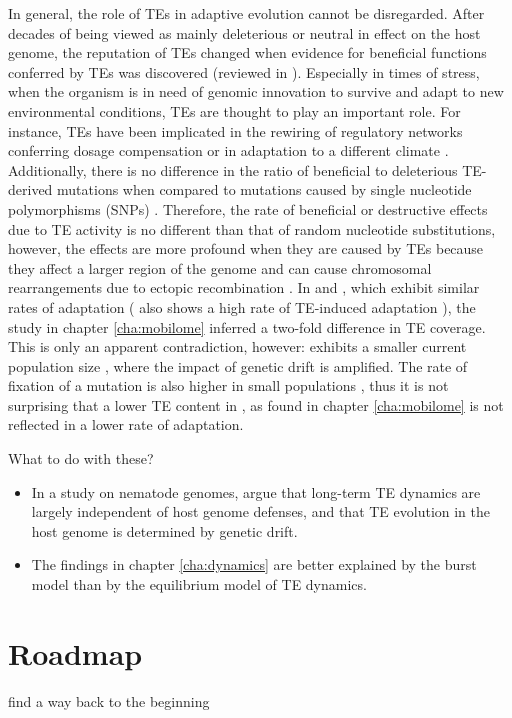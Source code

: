 In general, the role of TEs in adaptive evolution cannot be disregarded.
After decades of being viewed as mainly deleterious or neutral in effect
on the host genome, the reputation of TEs changed when evidence for
beneficial functions conferred by TEs was discovered (reviewed in
\citet{Oliver2012, Fedoroff2013}). Especially in times of stress, when
the organism is in need of genomic innovation to survive and adapt to
new environmental conditions, TEs are thought to play an important role.
For instance, TEs have been implicated in the rewiring of regulatory
networks conferring dosage compensation \citep{Ellison2013, Chuong2017}
or in adaptation to a different climate \citep{Gonzalez2010}.
Additionally, there is no difference in the ratio of beneficial to
deleterious TE-derived mutations when compared to mutations caused by
single nucleotide polymorphisms (SNPs) \citep{Akagi2013, Barron2014}.
Therefore, the rate of beneficial or destructive effects due to TE
activity is no different than that of random nucleotide substitutions,
however, the effects are more profound when they are caused by TEs
because they affect a larger region of the genome and can cause
chromosomal rearrangements due to ectopic recombination
\citep{Gray2000}. In  and , which exhibit similar rates of adaptation \citep{Bachtrog2008}
( also shows a high rate of TE-induced
adaptation \citep{Gonzalez2008}), the study in chapter
\ref{cha:mobilome} inferred a two-fold difference in TE coverage. This
is only an apparent contradiction, however: 
exhibits a smaller current population size \citep{Bachtrog2008}, where
the impact of genetic drift is amplified. The rate of fixation of a
mutation is also higher in small populations \citep{Kimura1969}, thus it
is not surprising that a lower TE content in , as
found in chapter \ref{cha:mobilome} is not reflected in a lower rate of
adaptation.

What to do with these?

\begin{itemize}
\item In a study on nematode genomes, \citet{Szitenberg2016} argue that
long-term TE dynamics are largely independent of host genome defenses,
and that TE evolution in the host genome is determined by genetic drift.

\item The findings in chapter \ref{cha:dynamics} are better explained by the
burst model than by the equilibrium model of TE dynamics. 
\end{itemize}

\section{Roadmap}

find a way back to the beginning

